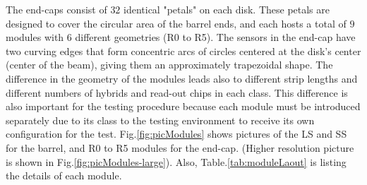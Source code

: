 The end-caps consist of $32$ identical "petals" on each disk. These petals are designed to cover the circular area of the barrel ends, and each hosts a total of $9$ modules with $6$ different geometries (R0 to R5). The sensors in the end-cap have two curving edges that form concentric arcs of circles centered at the disk's center (center of the beam), giving them an approximately trapezoidal shape. The difference in the geometry of the modules leads also to different strip lengths and different numbers of hybrids and read-out chips in each class. This difference is also important for the testing procedure because each module must be introduced separately due to its class to the testing environment to receive its own configuration for the test. 
Fig.\ref{fig:picModules} shows pictures of the LS and SS for the barrel, and R0 to R5 modules for the end-cap. (Higher resolution picture is shown in Fig.\ref{fig:picModules-large}). Also, Table.\ref{tab:moduleLaout} is listing the details of each module. 

